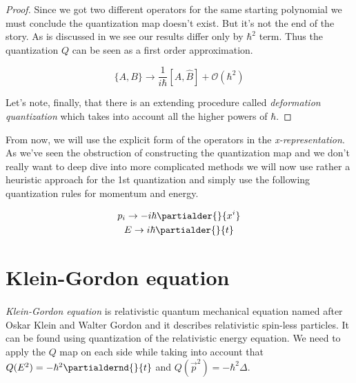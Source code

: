 \begin{proof}
    Since we got two different operators for the same starting polynomial we must conclude the quantization map doesn't exist. But
    it's not the end of the story. As is discussed in \cite{floarin_jung} we see our results differ only by $\hbar^{2}$ term. Thus
    the quantization $Q$ can be seen as a first order approximation.

    \begin{equation}
        \label{eq:dirac_quantization}
        \{A, B\} \to \frac{1}{i \hbar}[\hat{A}, \hat{B}] + \mathcal{O}(\hbar^{2})
    \end{equation}

    Let's note, finally, that there is an extending procedure called \textit{deformation quantization} which takes into
    account all the higher powers of $\hbar$.

\end{proof}

From now, we will use the explicit form of the operators in the \textit{x-representation}. As we've seen the obstruction of
constructing the quantization map and we don't really want to deep dive into more complicated methods we will now use rather
a heuristic approach for the 1st quantization and simply use the following quantization rules for momentum and energy.

\begin{equation}
    \begin{gathered}
        p_{i} \to - i \hbar \partialder{}{x^{i}} \\
        E \to i \hbar \partialder{}{t}
    \end{gathered}
\end{equation}


\section{Klein-Gordon equation}

\paragraph{} \textit{Klein-Gordon equation} is relativistic quantum mechanical equation named after Oskar Klein and Walter Gordon and
it describes relativistic spin-less particles. It can be found using quantization of the relativistic energy equation. We need to apply the
$Q$ map on each side while taking into account that $Q(E^2) = - \hbar^{2} \partialdernd{}{t}$ and 
$Q(\vec{p}^2) = - \hbar^{2} \Delta$.

